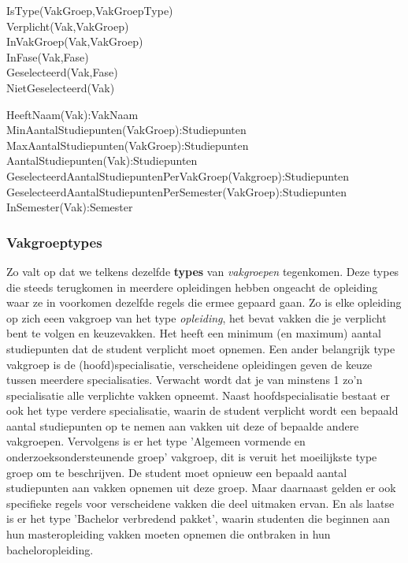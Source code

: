 \begin{description}
\item [IsType(VakGroep,VakGroepType)]
\item [Verplicht(Vak,VakGroep)]
\item [InVakGroep(Vak,VakGroep)]
\item [InFase(Vak,Fase)]
\item [Geselecteerd(Vak,Fase)]
\item [NietGeselecteerd(Vak)]
\end{description}

\begin{description}
\item [HeeftNaam(Vak):VakNaam]
\item [MinAantalStudiepunten(VakGroep):Studiepunten]
\item [MaxAantalStudiepunten(VakGroep):Studiepunten]
\item [AantalStudiepunten(Vak):Studiepunten]
\item [GeselecteerdAantalStudiepuntenPerVakGroep(Vakgroep):Studiepunten]
\item [GeselecteerdAantalStudiepuntenPerSemester(VakGroep):Studiepunten]
\item [InSemester(Vak):Semester]
\end{description}

\subsubsection{Vakgroeptypes}
Zo valt op dat we telkens dezelfde \textbf{types} van \emph{vakgroepen} tegenkomen. Deze types die steeds terugkomen in meerdere opleidingen hebben ongeacht de opleiding waar ze in voorkomen dezelfde regels die ermee gepaard gaan. Zo is elke opleiding op zich eeen vakgroep van het type \emph{opleiding}, het bevat vakken die je verplicht bent te volgen en keuzevakken. Het heeft een minimum (en maximum) aantal studiepunten dat de student verplicht moet opnemen. Een ander belangrijk type vakgroep is de (hoofd)specialisatie, verscheidene opleidingen geven de keuze tussen meerdere specialisaties. Verwacht wordt dat je van minstens 1 zo'n specialisatie alle verplichte vakken opneemt. Naast hoofdspecialisatie bestaat er ook het type verdere specialisatie, waarin de student verplicht wordt een bepaald aantal studiepunten op te nemen aan vakken uit deze of bepaalde andere vakgroepen. Vervolgens is er het type 'Algemeen vormende en onderzoeksondersteunende groep' vakgroep, dit is veruit het moeilijkste type groep om te beschrijven. De student moet opnieuw een bepaald aantal studiepunten aan vakken opnemen uit deze groep. Maar daarnaast gelden er ook specifieke regels voor verscheidene vakken die deel uitmaken ervan. En als laatse is er het type 'Bachelor verbredend pakket', waarin studenten die beginnen aan hun masteropleiding vakken moeten opnemen die ontbraken in hun bacheloropleiding.

